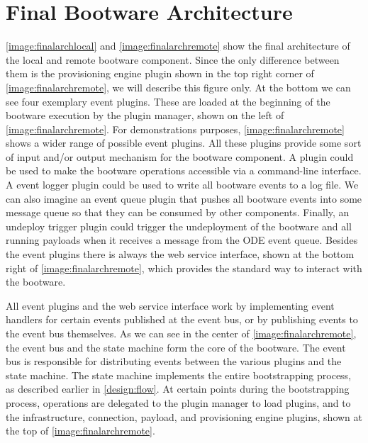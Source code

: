 \section{Final Bootware Architecture}
\label{design:finalarch}

\autoref{image:finalarchlocal} and \autoref{image:finalarchremote} show the final architecture of the local and remote bootware component.
Since the only difference between them is the provisioning engine plugin shown in the top right corner of \autoref{image:finalarchremote}, we will describe this figure only.
At the bottom we can see four exemplary event plugins.
These are loaded at the beginning of the bootware execution by the plugin manager, shown on the left of \autoref{image:finalarchremote}.
For demonstrations purposes, \autoref{image:finalarchremote} shows a wider range of possible event plugins.
All these plugins provide some sort of input and/or output mechanism for the bootware component.
A  plugin could be used to make the bootware operations accessible via a command-line interface.
A event logger plugin could be used to write all bootware events to a log file.
We can also imagine an event queue plugin that pushes all bootware events into some message queue so that they can be consumed by other components.
Finally, an undeploy trigger plugin could trigger the undeployment of the bootware and all running payloads when it receives a message from the ODE event queue.
Besides the event plugins there is always the web service interface, shown at the bottom right of \autoref{image:finalarchremote}, which provides the standard way to interact with the bootware.

All event plugins and the web service interface work by implementing event handlers for certain events published at the event bus, or by publishing events to the event bus themselves.
As we can see in the center of \autoref{image:finalarchremote}, the event bus and the state machine form the core of the bootware.
The event bus is responsible for distributing events between the various plugins and the state machine.
The state machine implements the entire bootstrapping process, as described earlier in \autoref{design:flow}.
At certain points during the bootstrapping process, operations are delegated to the plugin manager to load plugins, and to the infrastructure, connection, payload, and provisioning engine plugins, shown at the top of \autoref{image:finalarchremote}.

